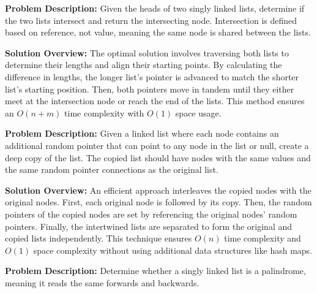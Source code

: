 
\textbf{Problem Description:}  
Given the heads of two singly linked lists, determine if the two lists intersect and return the intersecting node. Intersection is defined based on reference, not value, meaning the same node is shared between the lists.

\textbf{Solution Overview:}  
The optimal solution involves traversing both lists to determine their lengths and align their starting points. By calculating the difference in lengths, the longer list's pointer is advanced to match the shorter list's starting position. Then, both pointers move in tandem until they either meet at the intersection node or reach the end of the lists. This method ensures an \(O(n + m)\) time complexity with \(O(1)\) space usage.


\textbf{Problem Description:}  
Given a linked list where each node contains an additional random pointer that can point to any node in the list or null, create a deep copy of the list. The copied list should have nodes with the same values and the same random pointer connections as the original list.

\textbf{Solution Overview:}  
An efficient approach interleaves the copied nodes with the original nodes. First, each original node is followed by its copy. Then, the random pointers of the copied nodes are set by referencing the original nodes' random pointers. Finally, the intertwined lists are separated to form the original and copied lists independently. This technique ensures \(O(n)\) time complexity and \(O(1)\) space complexity without using additional data structures like hash maps.


\textbf{Problem Description:}  
Determine whether a singly linked list is a palindrome, meaning it reads the same forwards and backwards.

